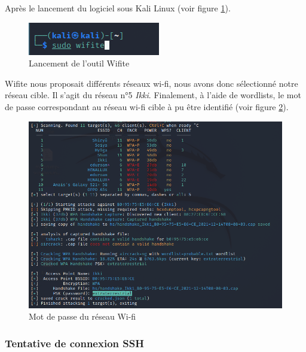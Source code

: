 \documentclass[french,paper=a4,oneside,captions=tableheading]{article}
\begin{document}
Après le lancement du logiciel sous Kali Linux (voir figure \ref{fig:wifite}).

\begin{figure}[H]
    \centering
    \includegraphics[width=0.50\linewidth]{images/wifite.png}
    \caption{Lancement de l'outil Wifite}
    \label{fig:wifite}
\end{figure}

Wifite nous proposait différents réseaux wi-fi, nous avons donc sélectionné notre réseau cible. Il s'agit du réseau n°5 \textit{Ikki}.
Finalement, à l'aide de wordlists, le mot de passe correspondant au réseau wi-fi cible à pu être identifié (voir figure \ref{fig:mdpwifi}).

\begin{figure}[H]
    \centering
    \includegraphics[width=0.99\linewidth]{images/mdpwifi.png}
    \caption{Mot de passe du réseau Wi-fi}
    \label{fig:mdpwifi}
\end{figure}



\subsubsection{Tentative de connexion SSH}
\end{document}
